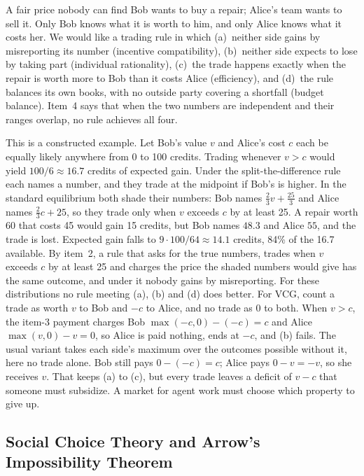 \begin{pdexample}{A fair price nobody can find}
Bob wants to buy a repair; Alice's team wants to sell it. Only Bob knows what
it is worth to him, and only Alice knows what it costs her. We would like a
trading rule in which (a)~neither side gains by misreporting its number
(incentive compatibility), (b)~neither side expects to lose by taking part
(individual rationality), (c)~the trade happens exactly when the repair is
worth more to Bob than it costs Alice (efficiency), and (d)~the rule balances
its own books, with no outside party covering a shortfall (budget balance).
Item~4 says that when the two numbers are independent and their ranges
overlap, no rule achieves all four.

This is a constructed example. Let Bob's value $v$ and Alice's cost $c$ each be
equally likely anywhere from 0 to 100 credits. Trading whenever $v>c$ would
yield $100/6\approx16.7$ credits of expected gain. Under the split-the-difference
rule each names a number, and they trade at the midpoint if Bob's is higher.
In the standard equilibrium both shade their numbers: Bob names
$\tfrac23v+\tfrac{25}{3}$ and Alice names $\tfrac23c+25$, so they trade only
when $v$ exceeds $c$ by at least 25. A repair worth 60 that costs 45 would gain
15 credits, but Bob names $48.3$ and Alice $55$, and the trade is lost.
Expected gain falls to $9\cdot100/64\approx14.1$ credits, 84\% of the 16.7
available. By item~2, a rule that asks for the true numbers, trades when $v$
exceeds $c$ by at least 25 and charges the price the shaded numbers would give
has the same outcome, and under it nobody gains by misreporting. For these
distributions no rule meeting (a), (b) and (d) does better. For VCG, count a trade as worth $v$ to Bob and $-c$ to Alice, and no
trade as 0 to both. When $v>c$, the item-3 payment charges Bob
$\max(-c,0)-(-c)=c$ and Alice $\max(v,0)-v=0$, so Alice is paid nothing, ends
at $-c$, and (b) fails. The usual variant takes each side's maximum over the
outcomes possible without it, here no trade alone. Bob still pays
$0-(-c)=c$; Alice pays $0-v=-v$, so she receives $v$. That keeps (a) to (c),
but every trade leaves a deficit of $v-c$ that someone must subsidize. A market
for agent work must choose which property to give up.
\end{pdexample}

\subsection{Social Choice Theory and Arrow's Impossibility Theorem}

